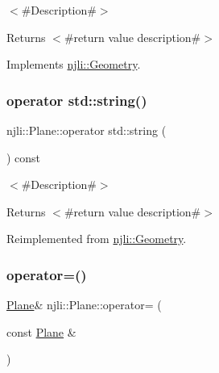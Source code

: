 $<$\#\+Description\#$>$

\begin{DoxyReturn}{Returns}
$<$\#return value description\#$>$ 
\end{DoxyReturn}


Implements \mbox{\hyperlink{classnjli_1_1_geometry_a27b42b7a7ed3c67a6f8827288828687a}{njli\+::\+Geometry}}.

\mbox{\label{classnjli_1_1_plane_a0530fd624d0fbb1b2629f74e81a8b0fa}} 
\subsubsection{\texorpdfstring{operator std\+::string()}{operator std::string()}}
{\footnotesize\ttfamily njli\+::\+Plane\+::operator std\+::string (\begin{DoxyParamCaption}{ }\end{DoxyParamCaption}) const\hspace{0.3cm}{\ttfamily [virtual]}}

$<$\#\+Description\#$>$

\begin{DoxyReturn}{Returns}
$<$\#return value description\#$>$ 
\end{DoxyReturn}


Reimplemented from \mbox{\hyperlink{classnjli_1_1_geometry_ae678ad91efebe665fc2f5533dc26fe24}{njli\+::\+Geometry}}.

\mbox{\label{classnjli_1_1_plane_a551051db5631112ed3bdcd68b49263cf}} 
\subsubsection{\texorpdfstring{operator=()}{operator=()}}
{\footnotesize\ttfamily \mbox{\hyperlink{classnjli_1_1_plane}{Plane}}\& njli\+::\+Plane\+::operator= (\begin{DoxyParamCaption}\item[{const \mbox{\hyperlink{classnjli_1_1_plane}{Plane}} \&}]{ }\end{DoxyParamCaption})\hspace{0.3cm}{\ttfamily [protected]}}

